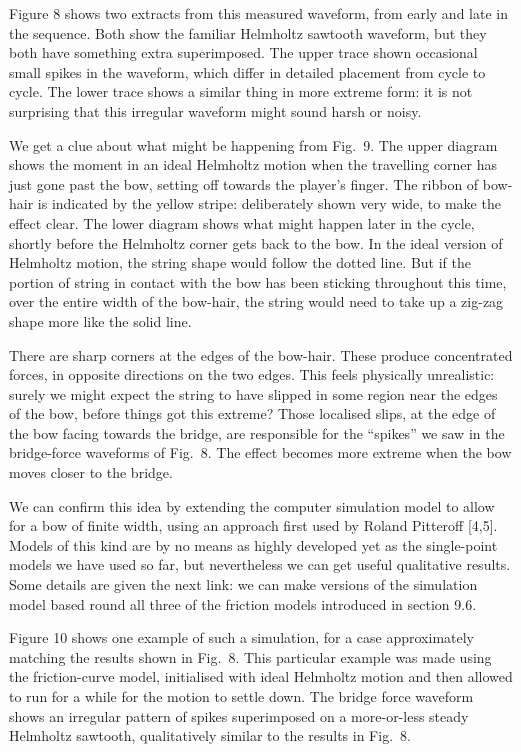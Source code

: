   Figure 8 shows two extracts from this measured waveform, from early and late 
  in the sequence. Both show the familiar Helmholtz sawtooth waveform, but they 
  both have something extra superimposed. The upper trace shown occasional 
  small spikes in the waveform, which differ in detailed placement from cycle 
  to cycle. The lower trace shows a similar thing in more extreme form: it is 
  not surprising that this irregular waveform might sound harsh or noisy. 

  We get a clue about what might be happening from Fig.\ 9. The upper diagram 
  shows the moment in an ideal Helmholtz motion when the travelling corner has 
  just gone past the bow, setting off towards the player’s finger. The ribbon 
  of bow-hair is indicated by the yellow stripe: deliberately shown very wide, 
  to make the effect clear. The lower diagram shows what might happen later in 
  the cycle, shortly before the Helmholtz corner gets back to the bow. In the 
  ideal version of Helmholtz motion, the string shape would follow the dotted 
  line. But if the portion of string in contact with the bow has been sticking 
  throughout this time, over the entire width of the bow-hair, the string would 
  need to take up a zig-zag shape more like the solid line. 

  There are sharp corners at the edges of the bow-hair. These produce 
  concentrated forces, in opposite directions on the two edges. This feels 
  physically unrealistic: surely we might expect the string to have slipped in 
  some region near the edges of the bow, before things got this extreme? Those 
  localised slips, at the edge of the bow facing towards the bridge, are 
  responsible for the “spikes” we saw in the bridge-force waveforms of Fig.\ 8. 
  The effect becomes more extreme when the bow moves closer to the bridge. 

  We can confirm this idea by extending the computer simulation model to allow 
  for a bow of finite width, using an approach first used by Roland Pitteroff 
  [4,5]. Models of this kind are by no means as highly developed yet as the 
  single-point models we have used so far, but nevertheless we can get useful 
  qualitative results. Some details are given the next link: we can make 
  versions of the simulation model based round all three of the friction models 
  introduced in section 9.6. 

  Figure 10 shows one example of such a simulation, for a case approximately 
  matching the results shown in Fig.\ 8. This particular example was made using 
  the friction-curve model, initialised with ideal Helmholtz motion and then 
  allowed to run for a while for the motion to settle down. The bridge force 
  waveform shows an irregular pattern of spikes superimposed on a more-or-less 
  steady Helmholtz sawtooth, qualitatively similar to the results in Fig.\ 8. 

